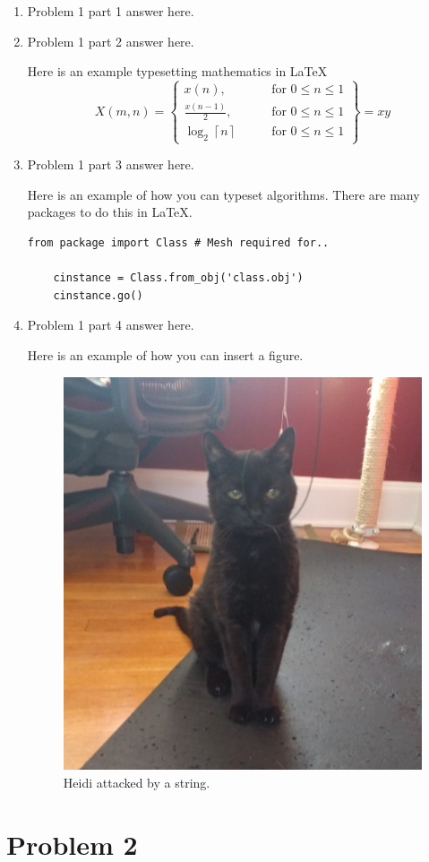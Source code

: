 \documentclass[12pt,letterpaper]{article}
\begin{document}
\begin{enumerate}
  \item
   Problem 1 part 1 answer here.
  \item
    Problem 1 part 2 answer here.

    Here is an example typesetting mathematics in \LaTeX
\begin{equation*}
    X(m,n) = \left\{\begin{array}{lr}
        x(n), & \text{for } 0\leq n\leq 1\\
        \frac{x(n-1)}{2}, & \text{for } 0\leq n\leq 1\\
        \log_2 \left\lceil n \right\rceil \qquad & \text{for } 0\leq n\leq 1
        \end{array}\right\} = xy
\end{equation*}

    \item Problem 1 part 3 answer here.

    Here is an example of how you can typeset algorithms.
    There are many packages to do this in \LaTeX.
     
     \begin{lstlisting}[style = Python]
    from package import Class # Mesh required for..
    
    cinstance = Class.from_obj('class.obj')
    cinstance.go()
    \end{lstlisting}
     
  \item Problem 1 part 4 answer here.

    Here is an example of how you can insert a figure.
    \begin{figure}[!h]
    \centering
    \includegraphics[width=0.3\linewidth]{heidi.jpg}
    \caption{Heidi attacked by a string.}
    \end{figure}
\end{enumerate}


\section*{Problem 2}

\fi
\end{document}
